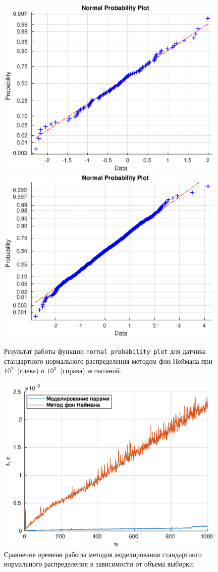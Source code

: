 \begin{figure}[t]
        \includegraphics[width=0.5\linewidth]{task_04/norm100.eps}
        \includegraphics[width=0.5\linewidth]{task_04/norm1000.eps}
        \caption{Результат работы функции \texttt{nornal probability plot} для датчика стандартного нормального распределения методом фон Неймана при $10^2$~(слева) и $10^3$~(справа) испытаний.}
\end{figure}
\begin{figure}[b]
        \includegraphics[width=\linewidth]{task_04/speed.eps}
        \caption{Сравнение времени работы методов моделирования стандартного нормального распределения в зависимости от объема выборки.}
\end{figure}